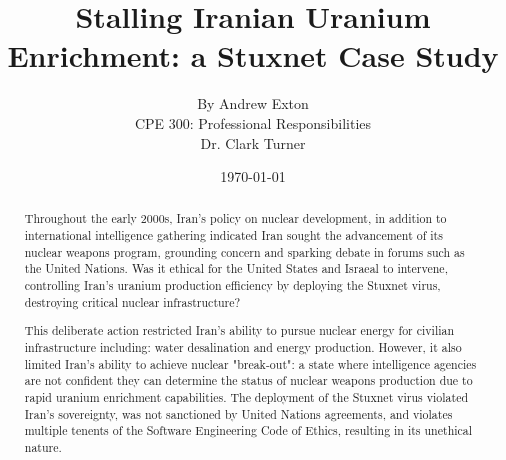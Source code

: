 \documentclass[12pt]{article}
\begin{document}
\title{\vfill Stalling Iranian Uranium Enrichment: a Stuxnet Case Study } %
\author{
By Andrew Exton \vspace{10pt} \\
CPE 300: Professional Responsibilities  \vspace{10pt} \\
Dr. Clark Turner \vspace{10pt} \\
}
\date{\today} %

\maketitle

\vfill  %
\begin{abstract}
Throughout the early 2000s, Iran's policy on nuclear development, in addition to international intelligence gathering indicated Iran sought the advancement of its nuclear weapons program, grounding concern and sparking debate in forums such as the United Nations.\cite{unitedNationsResolutions}
Was it ethical for the United States and Israeal to intervene, controlling Iran's uranium production efficiency by deploying the Stuxnet virus, destroying critical nuclear infrastructure?

This deliberate action restricted Iran's ability to pursue nuclear energy for civilian infrastructure including: water desalination and energy production. However, it also limited Iran's ability to achieve nuclear "break-out": a state where  intelligence agencies are not confident they can determine the status of nuclear weapons production due to rapid uranium enrichment capabilities. The deployment of the Stuxnet virus violated Iran's sovereignty, was not sanctioned by United Nations agreements, and violates multiple tenents of the Software Engineering Code of Ethics, resulting in its unethical nature.


\end{abstract}

\thispagestyle{empty} %
\newpage

\tableofcontents
\newpage
\end{document}
